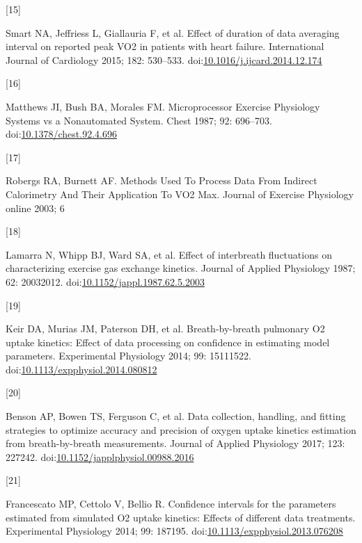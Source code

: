 \documentclass[
  letterpaper,
  DIV=11,
  numbers=noendperiod]{scrartcl}
\newlength{\cslhangindent}
\newlength{\csllabelwidth}
\newenvironment{CSLReferences}[2] %
 {\begin{list}{}{%
  \setlength{\itemindent}{0pt}
  \setlength{\leftmargin}{0pt}
  \setlength{\parsep}{0pt}
  \ifodd #1
   \setlength{\leftmargin}{\cslhangindent}
   \setlength{\itemindent}{-1\cslhangindent}
  \fi
  \setlength{\itemsep}{#2\baselineskip}}}
 {\end{list}}
\newcommand{\CSLLeftMargin}[1]{\parbox[t]{\csllabelwidth}{\strut#1\strut}}
\newcommand{\CSLRightInline}[1]{\parbox[t]{\linewidth - \csllabelwidth}{\strut#1\strut}}
\begin{document}
\begin{CSLReferences}{0}{1}
\CSLLeftMargin{{[}15{]} }%
\CSLRightInline{Smart NA, Jeffriess L, Giallauria F, et al. Effect of
duration of data averaging interval on reported peak VO2 in patients
with heart failure. International Journal of Cardiology 2015; 182:
530--533.
doi:\href{https://doi.org/10.1016/j.ijcard.2014.12.174}{10.1016/j.ijcard.2014.12.174}}

\CSLLeftMargin{{[}16{]} }%
\CSLRightInline{Matthews JI, Bush BA, Morales FM. Microprocessor
Exercise Physiology Systems vs a Nonautomated System. Chest 1987; 92:
696--703.
doi:\href{https://doi.org/10.1378/chest.92.4.696}{10.1378/chest.92.4.696}}

\CSLLeftMargin{{[}17{]} }%
\CSLRightInline{Robergs RA, Burnett AF. Methods Used To Process Data
From Indirect Calorimetry And Their Application To VO2 Max. Journal of
Exercise Physiology online 2003; 6}

\CSLLeftMargin{{[}18{]} }%
\CSLRightInline{Lamarra N, Whipp BJ, Ward SA, et al. Effect of
interbreath fluctuations on characterizing exercise gas exchange
kinetics. Journal of Applied Physiology 1987; 62: 20032012.
doi:\href{https://doi.org/10.1152/jappl.1987.62.5.2003}{10.1152/jappl.1987.62.5.2003}}

\CSLLeftMargin{{[}19{]} }%
\CSLRightInline{Keir DA, Murias JM, Paterson DH, et al. Breath-by-breath
pulmonary O2 uptake kinetics: Effect of data processing on confidence in
estimating model parameters. Experimental Physiology 2014; 99: 15111522.
doi:\href{https://doi.org/10.1113/expphysiol.2014.080812}{10.1113/expphysiol.2014.080812}}

\CSLLeftMargin{{[}20{]} }%
\CSLRightInline{Benson AP, Bowen TS, Ferguson C, et al. Data collection,
handling, and fitting strategies to optimize accuracy and precision of
oxygen uptake kinetics estimation from breath-by-breath measurements.
Journal of Applied Physiology 2017; 123: 227242.
doi:\href{https://doi.org/10.1152/japplphysiol.00988.2016}{10.1152/japplphysiol.00988.2016}}

\CSLLeftMargin{{[}21{]} }%
\CSLRightInline{Francescato MP, Cettolo V, Bellio R. Confidence
intervals for the parameters estimated from simulated O2 uptake
kinetics: Effects of different data treatments. Experimental Physiology
2014; 99: 187195.
doi:\href{https://doi.org/10.1113/expphysiol.2013.076208}{10.1113/expphysiol.2013.076208}}


\end{CSLReferences}
\end{document}
